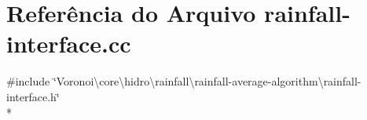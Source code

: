 \section{Referência do Arquivo rainfall-\/interface.cc}
\label{rainfall-interface_8cc}
{\ttfamily \#include \char`\"{}Voronoi\textbackslash{}core\textbackslash{}hidro\textbackslash{}rainfall\textbackslash{}rainfall-\/average-\/algorithm\textbackslash{}rainfall-\/interface.\+h\char`\"{}}\\*
